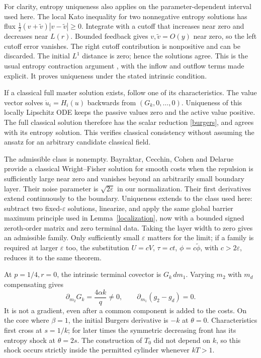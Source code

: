 \documentclass[11pt]{article}
\begin{document}
For clarity, entropy uniqueness also applies on the parameter-dependent interval used here. The local Kato inequality for two nonnegative entropy solutions has flux
$\tfrac12(v+\widetilde v)|v-\widetilde v|\ge0$. Integrate with a cutoff that increases near zero and decreases near $L(r)$. Bounded feedback gives $v,\widetilde v=O(y)$ near zero, so the left cutoff error vanishes. The right cutoff contribution is nonpositive and can be discarded. The initial $L^1$ distance is zero; hence the solutions agree. This is the usual entropy contraction argument \cite[Theorem~1]{Kru}, with the inflow and outflow terms made explicit. It proves uniqueness under the stated intrinsic condition.

If a classical full master solution exists, follow one of its characteristics. The value vector solves $\dot u_i=H_i(u)$ backwards from $(G_k,0,\ldots,0)$. Uniqueness of this locally Lipschitz ODE keeps the passive values zero and the active value positive. The full classical solution therefore has the scalar reduction \eqref{burgers}, and agrees with its entropy solution. This verifies classical consistency without assuming the ansatz for an arbitrary candidate classical field.

The admissible class is nonempty. Bayraktar, Cecchin, Cohen and Delarue \cite[Theorem~3.4, equation~(2.19)]{BCCD} provide a classical Wright--Fisher solution for smooth costs when the repulsion is sufficiently large near zero and vanishes beyond an arbitrarily small boundary layer. Their noise parameter is $\sqrt{2\varepsilon}$ in our normalization. Their first derivatives extend continuously to the boundary. Uniqueness extends to the class used here: subtract two fixed-$\varepsilon$ solutions, linearize, and apply the same global barrier maximum principle used in Lemma~\ref{localization}, now with a bounded signed zeroth-order matrix and zero terminal data. Taking the layer width to zero gives an admissible family. Only sufficiently small $\varepsilon$ matters for the limit; if a family is required at larger $\varepsilon$ too, the substitution $U=cV$, $\tau=ct$, $\phi=c\widetilde\phi$, with $c>2\varepsilon$, reduces it to the same theorem.

At $p=1/4,r=0$, the intrinsic terminal covector is $G_k\,dm_1$. Varying $m_2$ with $m_d$ compensating gives
\[
 \partial_{m_2}G_k=\frac{4\alpha k}{q}\ne0,
 \qquad \partial_{m_1}(g_2-g_d)=0.
\]
It is not a gradient, even after a common component is added to the costs. On the core where $\beta=1$, the initial Burgers derivative is $-k$ at $\theta=0$. Characteristics first cross at $s=1/k$; for later times the symmetric decreasing front has its entropy shock at $\theta=2s$. The construction of $T_0$ did not depend on $k$, so this shock occurs strictly inside the permitted cylinder whenever $kT>1$.
\end{document}
